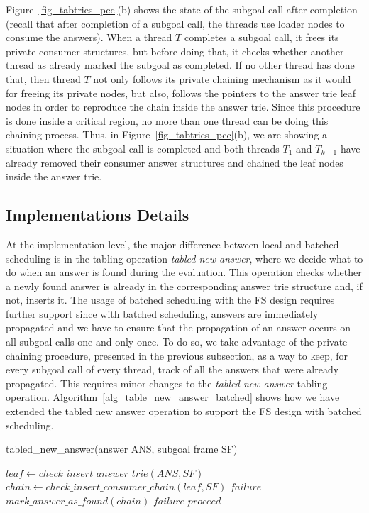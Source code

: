 \documentclass{llncs}
\begin{document}
Figure~\ref{fig_tabtries_pcc}(b) shows the state of the subgoal call
after completion (recall that after completion of a subgoal call, the
threads use loader nodes to consume the answers). When a thread $T$
completes a subgoal call, it frees its private consumer structures,
but before doing that, it checks whether another thread as already
marked the subgoal as completed. If no other thread has done that,
then thread $T$ not only follows its private chaining mechanism as it
would for freeing its private nodes, but also, follows the pointers to
the answer trie leaf nodes in order to reproduce the chain inside the
answer trie. Since this procedure is done inside a critical region, no
more than one thread can be doing this chaining process. Thus, in
Figure~\ref{fig_tabtries_pcc}(b), we are showing a situation where the
subgoal call is completed and both threads $T_1$ and $T_{k-1}$ have
already removed their consumer answer structures and chained the leaf
nodes inside the answer trie.

\subsection{Implementations Details}

At the implementation level, the major difference between local and
batched scheduling is in the tabling operation \emph{tabled new
  answer}, where we decide what to do when an answer is found during
the evaluation. This operation checks whether a newly found answer is
already in the corresponding answer trie structure and, if not,
inserts it. The usage of batched scheduling with the FS design
requires further support since with batched scheduling, answers are
immediately propagated and we have to ensure that the propagation of
an answer occurs on all subgoal calls one and only once. To do so, we
take advantage of the private chaining procedure, presented in the
previous subsection, as a way to keep, for every subgoal call of every
thread, track of all the answers that were already propagated. This
requires minor changes to the \emph{tabled new answer} tabling
operation. Algorithm~\ref{alg_table_new_answer_batched} shows how we
have extended the tabled new answer operation to support the FS design
with batched scheduling.

\begin{algorithm} [ht]
\caption{tabled\_new\_answer(answer ANS, subgoal frame SF)}
\begin{algorithmic}[1]
  \STATE $leaf \gets check\_insert\_answer\_trie(ANS, SF)$
  \STATE $chain \gets check\_insert\_consumer\_chain(leaf, SF)$
    \RETURN $failure$
    \STATE $mark\_answer\_as\_found(chain)$
      \RETURN $failure$
      \RETURN $proceed$
    \ENDIF
  \ENDIF  
\end{algorithmic}
\label{alg_table_new_answer_batched}
\end{algorithm}
\end{document}

